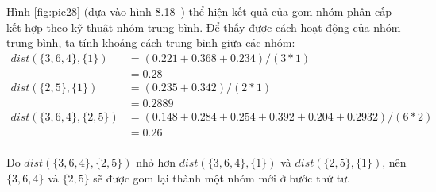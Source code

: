 Hình \ref{fig:pic28} (dựa vào hình 8.18~\cite{Vipin-Kumar}) thể hiện kết quả của gom nhóm phân cấp kết hợp theo kỹ thuật nhóm trung bình.
Để thấy được cách hoạt động của nhóm trung bình, ta tính khoảng cách trung bình giữa các nhóm:
\begin{equation}
\begin{aligned}
dist(\{3, 6, 4\}, \{1\})
&= (0.221 + 0.368 + 0.234) / (3 * 1)	\\ 
&= 0.28									\\
dist(\{2, 5\}, \{1\})
&= (0.235 + 0.342) / (2 * 1)			\\
&= 0.2889								\\
dist(\{3, 6, 4\}, \{2, 5\})				
&= (0.148 + 0.284 + 0.254 + 0.392 + 0.204 + 0.2932) /  (6 * 2)	\\
&= 0.26									\\
\end{aligned}
\end{equation}

Do $dist(\{3, 6, 4\}, \{2, 5\})$ nhỏ hơn $dist(\{3, 6, 4\}, \{1\})$ và $dist(\{2, 5\}, \{1\})$, nên $\{3, 6, 4\}$ và $\{2, 5\}$ sẽ được gom lại thành một nhóm mới ở bước thứ tư.

